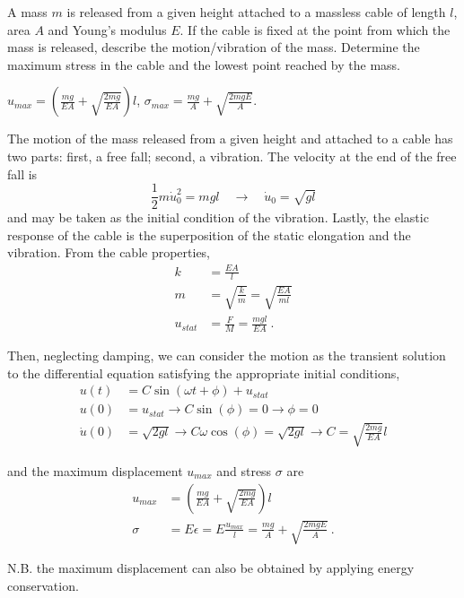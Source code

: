 
\begin{Exercise}[label={mass_released}]
A mass $m$ is released from a given height attached to a massless cable of length $l$, area $A$ and Young's modulus $E$. If the cable is fixed at the point from which the mass is released, describe the motion/vibration of the mass. Determine the maximum stress in the cable and the lowest point reached by the mass.

\begin{center}
\end{center}

\shortAnswer $u_{max} = \left(\frac{mg}{EA} + \sqrt{\frac{2mg}{EA}}\right)l$, $\sigma_{max} = \frac{mg}{A} + \sqrt{\frac{2mgE}{A}}$.
\end{Exercise}



\begin{Answer}[ref={mass_released}]
The motion of the mass released from a given height and attached to a cable has two parts: first, a free fall; second, a vibration. The velocity at the end of the free fall is
$$
\frac{1}{2}m\dot{u}_0^2 = mgl \quad \rightarrow \quad \dot{u}_0 = \sqrt{gl}
$$
and may be taken as the initial condition of the vibration. Lastly, the elastic response of the cable is the superposition of the static elongation and the vibration. From the cable properties,
\begin{align*}
k &= \frac{EA}{l} \\
m &= \sqrt{\frac{k}{m}} = \sqrt{\frac{EA}{ml}} \\
u_{stat} &= \frac{F}{M} = \frac{mgl}{EA}\ .
\end{align*}

Then, neglecting damping, we can consider the motion as the transient solution to the differential equation satisfying the appropriate initial conditions,
\begin{align*}
u(t) &= C\sin(\omega t + \phi) + u_{stat} \\
u(0) &= u_{stat} \rightarrow C\sin(\phi) = 0 \rightarrow \phi = 0 \\
\dot{u}(0) &= \sqrt{2gl} \rightarrow C\omega\cos(\phi) =  \sqrt{2gl} \rightarrow C = \sqrt{\frac{2mg}{EA}}l
\end{align*}

and the maximum displacement $u_{max}$ and stress $\sigma$ are
\begin{align*}
u_{max} &= \left(\frac{mg}{EA} + \sqrt{\frac{2mg}{EA}}\right)l \\
\sigma &= E\epsilon = E\frac{u_{max}}{l} = \frac{mg}{A} + \sqrt{\frac{2mgE}{A}}\ .
\end{align*}

N.B. the maximum displacement can also be obtained by applying energy conservation.
\end{Answer}
